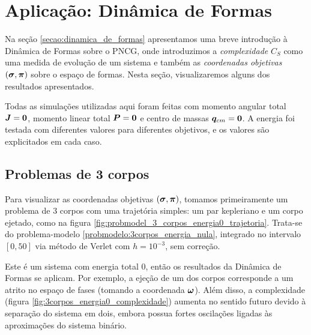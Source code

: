 \section{Aplicação: Dinâmica de Formas}\label{secao:simulacao_dinamica_de_formas}

Na seção \ref{secao:dinamica_de_formas} apresentamos uma breve introdução à Dinâmica de Formas sobre o PNCG, onde introduzimos a \textit{complexidade} $C_S$ como uma medida de evolução de um sistema e também as \textit{coordenadas objetivas} $(\bm \sigma, \bm \pi)$ sobre o espaço de formas. Nesta seção, visualizaremos alguns dos resultados apresentados.

Todas as simulações utilizadas aqui foram feitas com momento angular total $\bm J = \bm 0$, momento linear total $\bm P = \bm 0$ e centro de massas $\bm q_{cm} = \bm 0$. A energia foi testada com diferentes valores para diferentes objetivos, e os valores são explicitados em cada caso.



\subsection{Problemas de 3 corpos}

Para visualizar as coordenadas objetivas $(\bm \sigma, \bm \pi)$, tomamos primeiramente um problema de 3 corpos com uma trajetória simples: um par kepleriano e um corpo ejetado, como na figura \ref{fig:probmodel_3_corpos_energia0_trajetoria}. Trata-se do problema-modelo \ref{probmodelo:3corpos_energia_nula}, integrado no intervalo $[0,50]$ via método de Verlet com $h=10^{-3}$, sem correção.

Este é um sistema com energia total 0, então os resultados da Dinâmica de Formas se aplicam. Por exemplo, a ejeção de um dos corpos corresponde a um atrito no espaço de fases (tomando a coordenada $\bm \omega$). Além disso, a complexidade (figura \ref{fig:3corpos_energia0_complexidade}) aumenta no sentido futuro devido à separação do sistema em dois, embora possua fortes oscilações ligadas às aproximações do sistema binário.

